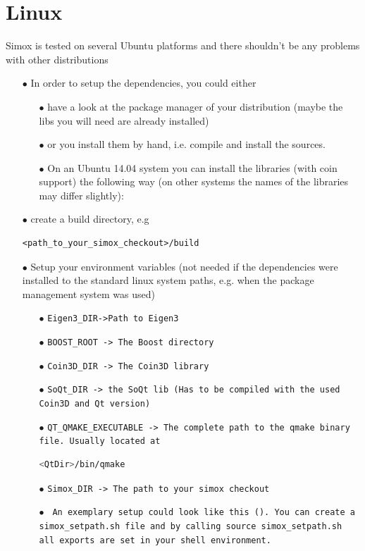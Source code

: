 \documentclass{book}
\begin{document}
\section{Linux}
Simox is tested on several Ubuntu platforms and there shouldn't be any problems with other distributions 
\begin{itemize}

\item[$\bullet$] In order to setup the dependencies, you could either 
\begin{itemize}
\item[$\bullet$] have a look at the package manager of your distribution (maybe the libs you will need are already installed) 
\item[$\bullet$] or you install them by hand, i.e. compile and install the sources.  
\item[$\bullet$] On an Ubuntu 14.04 system you can install the libraries (with coin support) the following way (on other systems the names of the libraries may differ slightly):
\end{itemize}
\item[$\bullet$] create a build directory, e.g \begin{lstlisting}
<path_to_your_simox_checkout>/build
\end{lstlisting}
\item[$\bullet$] Setup your environment variables (not needed if the dependencies were installed to the standard linux system paths, e.g. when the package management system was used) 
\begin{itemize}
\item[$\bullet$] \texttt{Eigen3\_DIR->Path to Eigen3}
\item[$\bullet$] \texttt{BOOST\_ROOT -> The Boost directory }
\item[$\bullet$] \texttt{Coin3D\_DIR -> The Coin3D library  }
\item[$\bullet$] \texttt{SoQt\_DIR -> the SoQt lib (Has to be compiled with the used Coin3D and Qt version)  }
\item[$\bullet$] \texttt{QT\_QMAKE\_EXECUTABLE -> The complete path to the qmake binary file. Usually located at } \begin{lstlisting}[language=bash]
<QtDir>/bin/qmake
\end{lstlisting}
\item[$\bullet$] \texttt{Simox\_DIR -> The path to your simox checkout }
\item[$\bullet$] \texttt{ An exemplary setup could look like this (\textbf{}). You can create a simox\_setpath.sh file and by calling source simox\_setpath.sh all exports are set in your shell environment. }


\end{itemize}
\end{itemize}
\end{document}
